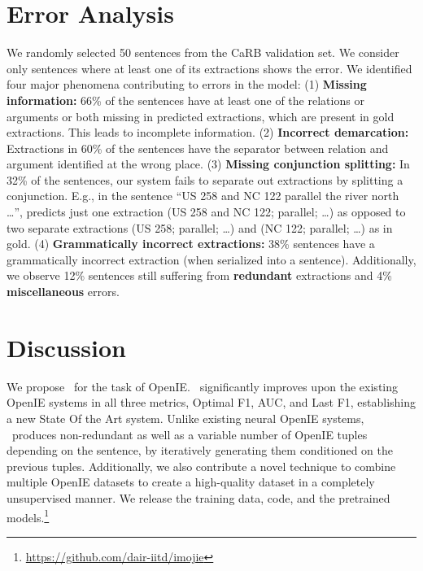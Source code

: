 \section{Error Analysis}
    We randomly selected 50 sentences from the CaRB validation set. We consider only sentences where at least one of its extractions shows the error. We identified four major phenomena contributing to errors in the \shortname{} model: \newline
    (1) \textbf{Missing information:} 66\% of the sentences have at least one of the relations or arguments or both missing in predicted extractions, which are present in gold extractions. This leads to incomplete information. \newline
    (2) \textbf{Incorrect demarcation:} Extractions in 60\% of the sentences have the separator between relation and argument identified at the wrong place. \newline
    (3) \textbf{Missing conjunction splitting:} In 32\% of the sentences, our system fails to separate out extractions by splitting a conjunction.  E.g., in the sentence ``US 258 and NC 122 parallel the river north \dots'', \shortname{} predicts just one extraction (US 258 and NC 122; parallel; \dots) as opposed to two separate extractions (US 258; parallel; \dots) and (NC 122; parallel; \dots) as in gold. \newline
    (4) \textbf{Grammatically incorrect extractions:} 38\% sentences have a grammatically incorrect extraction (when serialized into a sentence).  \newline
    Additionally, we observe 12\% sentences still suffering from \textbf{redundant} extractions and 4\% \textbf{miscellaneous} errors.

\section{Discussion}

    We propose \shortname~for the task of OpenIE. \shortname~significantly improves upon the existing OpenIE systems in all three metrics, Optimal F1, AUC, and Last F1, establishing a new State Of the Art system. Unlike existing neural OpenIE systems, \shortname~produces non-redundant as well as a variable number of OpenIE tuples depending on the sentence, by iteratively generating them conditioned on the previous tuples. Additionally, we also contribute a novel technique to combine multiple OpenIE datasets to create a high-quality dataset in a completely unsupervised manner. We release the training data, code, and the pretrained models.\footnote{\href{https://github.com/dair-iitd/imojie}{https://github.com/dair-iitd/imojie}}

